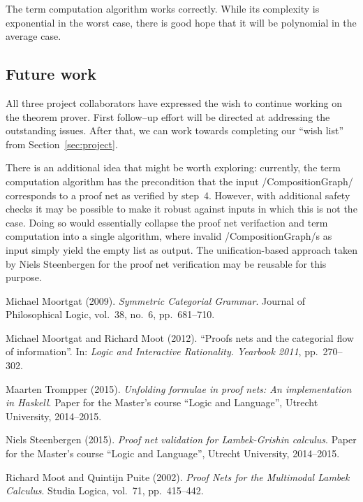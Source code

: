 \documentclass[12pt,a4paper]{article}
\begin{document}
The term computation algorithm works correctly. While its complexity is exponential in the worst case, there is good hope that it will be polynomial in the average case.


\subsection{Future work}

All three project collaborators have expressed the wish to continue working on the theorem prover. First follow--up effort will be directed at addressing the outstanding issues. After that, we can work towards completing our ``wish list'' from Section~\ref{sec:project}.

There is an additional idea that might be worth exploring: currently, the term computation algorithm has the precondition that the input \hs/CompositionGraph/ corresponds to a proof net as verified by step~4. However, with additional safety checks it may be possible to make it robust against inputs in which this is not the case. Doing so would essentially collapse the proof net verifaction and term computation into a single algorithm, where invalid \hs/CompositionGraph/s as input simply yield the empty list as output. The unification-based approach taken by Niels Steenbergen for the proof net verification \cite{niels} may be reusable for this purpose.


\begin{thebibliography}{9}
        Michael Moortgat (2009).
        \emph{Symmetric Categorial Grammar}.
        Journal of Philosophical Logic,
        vol.~38, no.~6, pp.~681--710.
    
        Michael Moortgat and Richard Moot (2012).
        ``Proofs nets and the categorial flow of information''.
        In: \emph{Logic and Interactive Rationality. Yearbook 2011},
        pp.~270--302.
    
        Maarten Trompper (2015).
        \emph{Unfolding formulae in proof nets: An implementation in Haskell}.
        Paper for the Master's course ``Logic and Language'',
        Utrecht University, 2014--2015.
    
        Niels Steenbergen (2015).
        \emph{Proof net validation for Lambek-Grishin calculus}.
        Paper for the Master's course ``Logic and Language'',
        Utrecht University, 2014--2015.
    
        Richard Moot and Quintijn Puite (2002).
        \emph{Proof Nets for the Multimodal Lambek Calculus}.
        Studia Logica, vol.~71, pp.~415--442.
\end{thebibliography}
\end{document}
